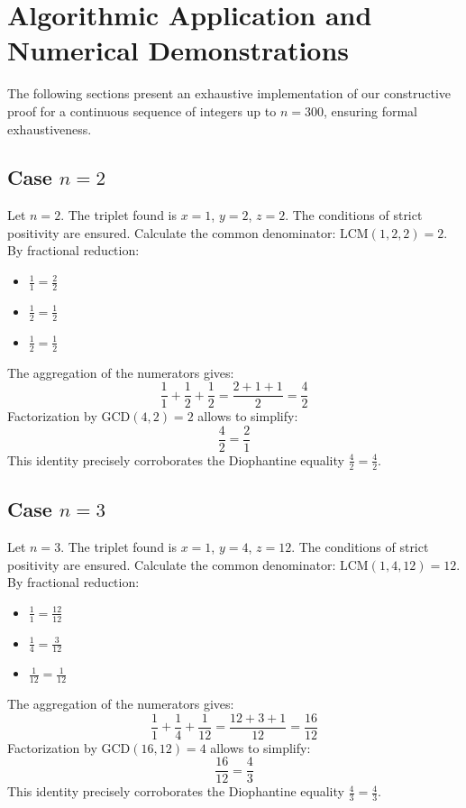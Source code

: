 \documentclass[11pt,a4paper]{article}
\begin{document}
\section{Algorithmic Application and Numerical Demonstrations}

The following sections present an exhaustive implementation of our constructive proof for a continuous sequence of integers up to $n = 300$, ensuring formal exhaustiveness.


\subsection{Case $n = 2$}
Let $n = 2$. The triplet found is $x = 1$, $y = 2$, $z = 2$.
The conditions of strict positivity are ensured.
Calculate the common denominator: $\text{LCM}(1, 2, 2) = 2$.
By fractional reduction:
\begin{itemize}
    \item $\frac{1}{1} = \frac{2}{2}$
    \item $\frac{1}{2} = \frac{1}{2}$
    \item $\frac{1}{2} = \frac{1}{2}$
\end{itemize}
The aggregation of the numerators gives:
$$ \frac{1}{1} + \frac{1}{2} + \frac{1}{2} = \frac{2 + 1 + 1}{2} = \frac{4}{2} $$
Factorization by $\text{GCD}(4, 2) = 2$ allows to simplify:
$$ \frac{4}{2} = \frac{2}{1} $$
This identity precisely corroborates the Diophantine equality $\frac{4}{2} = \frac{4}{2}$.

\subsection{Case $n = 3$}
Let $n = 3$. The triplet found is $x = 1$, $y = 4$, $z = 12$.
The conditions of strict positivity are ensured.
Calculate the common denominator: $\text{LCM}(1, 4, 12) = 12$.
By fractional reduction:
\begin{itemize}
    \item $\frac{1}{1} = \frac{12}{12}$
    \item $\frac{1}{4} = \frac{3}{12}$
    \item $\frac{1}{12} = \frac{1}{12}$
\end{itemize}
The aggregation of the numerators gives:
$$ \frac{1}{1} + \frac{1}{4} + \frac{1}{12} = \frac{12 + 3 + 1}{12} = \frac{16}{12} $$
Factorization by $\text{GCD}(16, 12) = 4$ allows to simplify:
$$ \frac{16}{12} = \frac{4}{3} $$
This identity precisely corroborates the Diophantine equality $\frac{4}{3} = \frac{4}{3}$.
\end{document}

